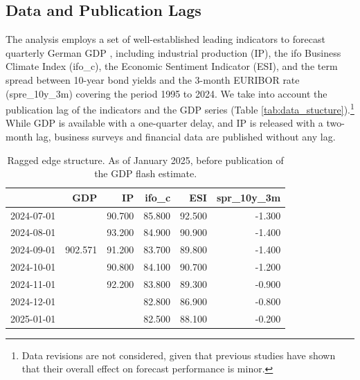 \documentclass[11pt,a4paper]{article}
\begin{document}
\subsection{Data and Publication Lags}
The analysis employs a set of well-established leading indicators to forecast quarterly German GDP \citep{Drechsel2012financial,Heinisch2018bottom}, including industrial production (IP), the ifo Business Climate Index (ifo\_c), the Economic Sentiment Indicator (ESI), and the term spread between 10-year bond yields and the 3-month EURIBOR rate (spre\_10y\_3m) covering the period 1995 to 2024.  
We take into account the publication lag of the indicators and the GDP series (Table \eqref{tab:data_stucture}).\footnote{Data revisions are not considered, given that previous studies \citep{Heinisch2019} have shown that their overall effect on forecast performance is minor.} 
While GDP is available with a one-quarter delay, and IP is released with a two-month lag, business surveys and financial data are published without any lag. %


\begin{table}[ht]
\centering
\begin{tabular}{rrrrrr}
  \hline
 & GDP & IP & ifo\_c & ESI & spr\_10y\_3m \\ 
  \hline
2024-07-01 &  & 90.700 & 85.800 & 92.500 & -1.300 \\ 
  2024-08-01 &  & 93.200 & 84.900 & 90.900 & -1.400 \\ 
  2024-09-01 &902.571  & 91.200 & 83.700 & 89.800 & -1.400 \\ 
  2024-10-01 &  & 90.800 & 84.100 & 90.700 & -1.200 \\ 
  2024-11-01 &  & 92.200 & 83.800 & 89.300 & -0.900 \\ 
  2024-12-01 &  &  & 82.800 & 86.900 & -0.800 \\ 
  2025-01-01 &  &  & 82.500 & 88.100 & -0.200 \\ 
   \hline
\end{tabular}
\caption{Ragged edge structure. As of January 2025, before publication of the GDP flash estimate.} 
\label{tab:data_stucture}
\end{table}
\end{document}
